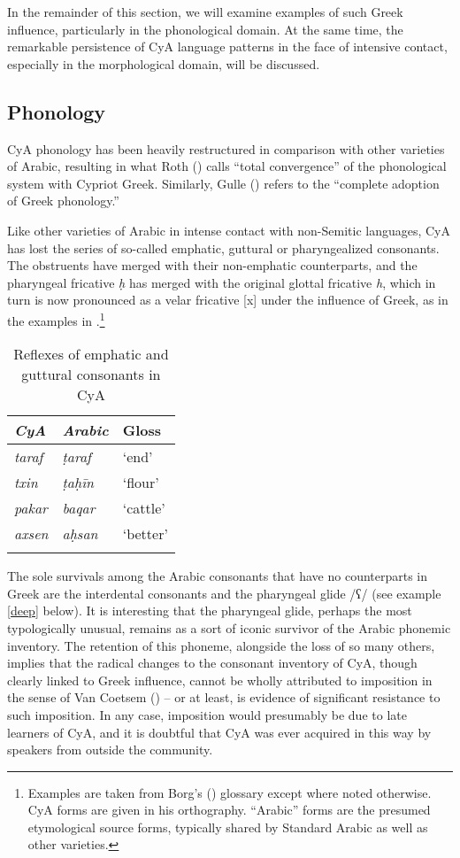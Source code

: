 \documentclass[output=paper]{langsci/langscibook}
\begin{document}
In the remainder of this section, we will examine examples of such Greek influence, particularly in the phonological domain. At the same time, the remarkable persistence of CyA language patterns in the face of intensive contact, especially in the morphological domain, will be discussed.

\subsection{Phonology}

CyA phonology has been heavily restructured in comparison with other varieties of Arabic, resulting in what Roth (\citeyear[55]{Roth2004}) calls “total convergence” of the phonological system with Cypriot Greek. Similarly, Gulle (\citeyear[47]{Gulle2016}) refers to the “complete adoption of Greek phonology.” 

Like other varieties of Arabic in intense contact with non-Semitic languages, CyA has lost the series of so-called emphatic, guttural or pharyngealized consonants. The obstruents have merged with their non-emphatic counterparts, and the pharyngeal fricative \textit{ḥ} has merged with the original glottal fricative \textit{h}, which in turn is now pronounced as a velar fricative [x] under the influence of Greek, as in the examples in .\footnote{Examples are taken from Borg's (\citeyear{Borg2004}) glossary except where noted otherwise. CyA forms are given in his orthography. “Arabic” forms are the presumed etymological source forms, typically shared by Standard Arabic as well as other varieties.}  

\begin{table}
\begin{tabular}{>{\itshape}l>{\itshape}ll}
\lsptoprule
{\normalfont CyA} & {\normalfont Arabic} & {Gloss}\\\midrule
taraf & ṭaraf & ‘end’\\
txin & ṭaḥīn & ‘flour’\\
pakar & baqar & ‘cattle’\\
axsen & aḥsan & ‘better’\\
\lspbottomrule
\end{tabular}
\caption{\label{bkm:Ref13774757}Reflexes of emphatic and guttural consonants in CyA\label{tab:walter:1}}
\end{table}

The sole survivals among the Arabic consonants that have no counterparts in Greek are the interdental consonants and the pharyngeal glide /ʕ/ (see example \ref{deep} below). It is interesting that the pharyngeal glide, perhaps the most typologically unusual, remains as a sort of iconic survivor of the Arabic phonemic inventory. The retention of this phoneme, alongside the loss of so many others, implies that the radical changes to the consonant inventory of CyA, though clearly linked to Greek influence, cannot be wholly attributed to imposition in the sense of Van Coetsem (\citeyear{VanCoetsem1988,VanCoetsem2000}) – or at least, is evidence of significant resistance to such imposition. In any case, imposition would presumably be due to late learners of CyA, and it is doubtful that CyA was ever acquired in this way by speakers from outside the community.
\end{document}
